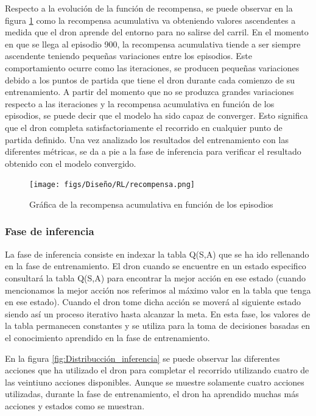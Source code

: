 Respecto a la evolución de la función de recompensa, se puede observar en la figura \ref{fig:recompensa} como la recompensa acumulativa va obteniendo valores ascendentes a medida que el dron 
aprende del entorno para no salirse del carril. En el momento en que se llega al episodio 900, la recompensa acumulativa tiende a ser siempre ascendente teniendo pequeñas variaciones entre los 
episodios. Este comportamiento ocurre como las iteraciones, se producen pequeñas variaciones debido a los puntos de partida que tiene el dron durante cada comienzo de su entrenamiento. A partir 
del momento 
que no se produzca grandes variaciones respecto a las iteraciones y la recompensa acumulativa en función de los episodios, se puede decir que el modelo ha sido capaz de converger. Esto significa
que el dron completa satisfactoriamente el recorrido en cualquier punto de partida definido. Una vez analizado los resultados del entrenamiento con las diferentes métricas, se da a pie a la 
fase de inferencia para verificar el resultado obtenido con el modelo convergido.

\begin{figure} [H]
  \begin{center}
    \texttt{[image: figs/Diseño/RL/recompensa.png]}
  \end{center}
  \caption{Gráfica de la recompensa acumulativa en función de los episodios}
  \label{fig:recompensa}
\end{figure}

\subsubsection{Fase de inferencia}
\label{sec:fases_inferencia}
La fase de inferencia consiste en indexar la tabla Q(S,A) que se ha ido rellenando en la fase de entrenamiento. El dron cuando se encuentre en un estado especifico consultará la tabla Q(S,A) para
encontrar la mejor acción en ese estado (cuando mencionamos la mejor acción nos referimos al máximo valor en la tabla que tenga en ese estado). Cuando el dron tome dicha acción se moverá al siguiente estado
siendo así un proceso iterativo hasta alcanzar la meta. En esta fase, los valores de la tabla permanecen constantes y se utiliza para la toma de decisiones basadas en el conocimiento
aprendido en la fase de entrenamiento. \newline

En la figura \ref{fig:Distribucción_inferencia} se puede observar las diferentes acciones que ha utilizado el dron para completar el recorrido utilizando cuatro de las veintiuno acciones
disponibles. Aunque se muestre solamente cuatro acciones utilizadas, durante la fase de entrenamiento, el dron ha aprendido muchas más acciones y estados como se muestran. 

